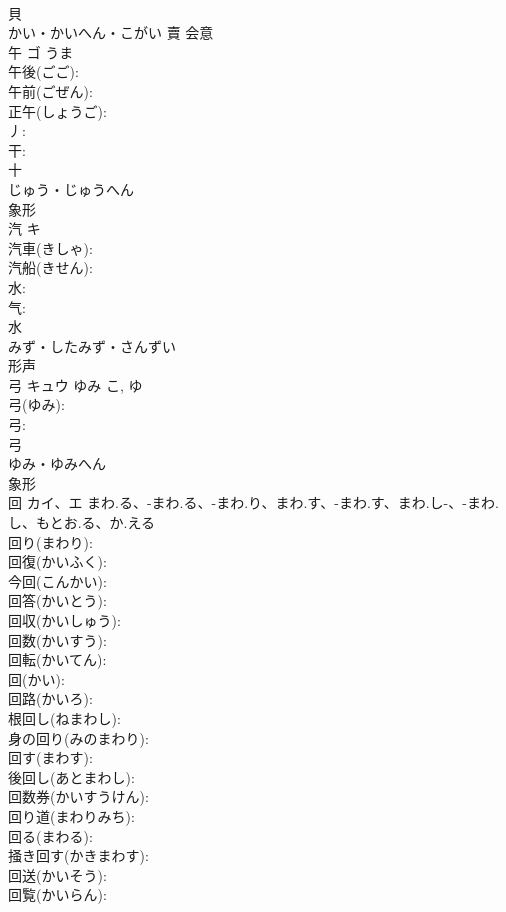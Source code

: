 \documentclass[8pt]{extreport}
\begin{document}
\begin{CJK}{UTF8}{min}
\\	貝	
\\	かい・かいへん・こがい	賣	会意 
\\	午	ゴ	うま		
\\	午後(ごご): 
\\	午前(ごぜん): 
\\	正午(しょうご): 
\\	丿: 
\\	干: 
\\	十	
\\	じゅう・じゅうへん	
\\	象形 
\\	汽	キ			
\\	汽車(きしゃ): 
\\	汽船(きせん): 
\\	水: 
\\	气: 
\\	水	
\\	みず・したみず・さんずい	
\\	形声 
\\	弓	キュウ	ゆみ	こ, ゆ	
\\	弓(ゆみ): 
\\	弓: 
\\	弓	
\\	ゆみ・ゆみへん	
\\	象形 
\\	回	カイ、エ	まわ.る、-まわ.る、-まわ.り、まわ.す、-まわ.す、まわ.し-、-まわ.し、もとお.る、か.える		
\\	回り(まわり): 
\\	回復(かいふく): 
\\	今回(こんかい): 
\\	回答(かいとう): 
\\	回収(かいしゅう): 
\\	回数(かいすう): 
\\	回転(かいてん): 
\\	回(かい): 
\\	回路(かいろ): 
\\	根回し(ねまわし): 
\\	身の回り(みのまわり): 
\\	回す(まわす): 
\\	後回し(あとまわし): 
\\	回数券(かいすうけん): 
\\	回り道(まわりみち): 
\\	回る(まわる): 
\\	掻き回す(かきまわす): 
\\	回送(かいそう): 
\\	回覧(かいらん): 

\end{CJK}
\end{document}
